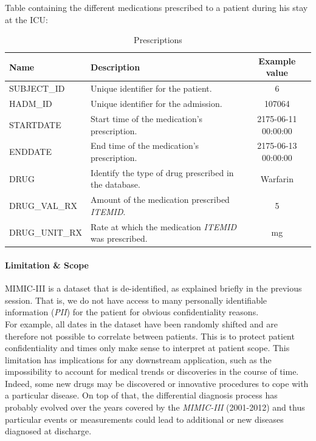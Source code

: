 Table containing the different medications prescribed to a patient during his stay at the ICU:

\begin{table}[H]
 \begin{center}
  \caption{Prescriptions}
  \begin{tabular}{| l | p{5cm} | c | }
   \hline
   \textbf{Name} & \textbf{Description} & \textbf{Example value} \\ \hline
   SUBJECT\_ID &  Unique identifier for the patient. & 6 \\ \hline
   HADM\_ID & Unique identifier for the admission. & 107064 \\ \hline
   STARTDATE & Start time of the medication's prescription. & 2175-06-11 00:00:00 \\ \hline
   ENDDATE & End time of the medication's prescription. & 2175-06-13 00:00:00 \\ \hline
   DRUG & Identify the type of drug prescribed in the database. & Warfarin \\ \hline
   DRUG\_VAL\_RX & Amount of the medication prescribed \textit{ITEMID}. & 5 \\ \hline
   DRUG\_UNIT\_RX & Rate at which the medication \textit{ITEMID} was prescribed. & mg \\
   \hline
  \end{tabular}
 \end{center}
\end{table}

\paragraph{Limitation \& Scope}
MIMIC-III is a dataset that is de-identified, as explained briefly in the previous session. That is, we do not have access to many personally identifiable information (\textit{PII}) for the patient for obvious confidentiality reasons. \\

For example, all dates in the dataset have been randomly shifted and are therefore not possible to correlate between patients. This is to protect patient confidentiality and times only make sense to interpret at patient scope. This limitation has implications for any downstream application, such as the impossibility to account for medical trends or discoveries in the course of time. \\

Indeed, some new drugs may be discovered or innovative procedures to cope with a particular disease. On top of that, the differential diagnosis process has probably evolved over the years covered by the \textit{MIMIC-III} (2001-2012) and thus particular events or measurements could lead to additional or new diseases diagnosed at discharge.


